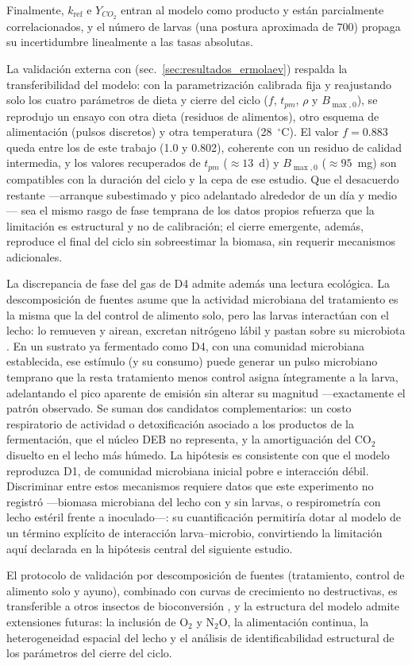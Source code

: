 Finalmente, $k_{\mathrm{ref}}$ e $Y_{CO_2}$ entran al modelo como producto y están parcialmente correlacionados, y el número de larvas (una postura aproximada de 700) propaga su incertidumbre linealmente a las tasas absolutas.

La validación externa con \textcite{ermolaevGreenhouseGasEmissions2019} (sec.~\ref{sec:resultados_ermolaev}) respalda la transferibilidad del modelo: con la parametrización calibrada fija y reajustando solo los cuatro parámetros de dieta y cierre del ciclo ($f$, $t_{pm}$, $\rho$ y $B_{\max,0}$), se reprodujo un ensayo con otra dieta (residuos de alimentos), otro esquema de alimentación (pulsos discretos) y otra temperatura (28~$^{\circ}$C). El valor $f = 0.883$ queda entre los de este trabajo (1.0 y 0.802), coherente con un residuo de calidad intermedia, y los valores recuperados de $t_{pm}$ ($\approx 13$~d) y $B_{\max,0}$ ($\approx 95$~mg) son compatibles con la duración del ciclo y la cepa de ese estudio. Que el desacuerdo restante ---arranque subestimado y pico adelantado alrededor de un día y medio--- sea el mismo rasgo de fase temprana de los datos propios refuerza que la limitación es estructural y no de calibración; el cierre emergente, además, reproduce el final del ciclo sin sobreestimar la biomasa, sin requerir mecanismos adicionales.

La discrepancia de fase del gas de D4 admite además una lectura ecológica. La descomposición de fuentes asume que la actividad microbiana del tratamiento es la misma que la del control de alimento solo, pero las larvas interactúan con el lecho: lo remueven y airean, excretan nitrógeno lábil y pastan sobre su microbiota \parencite{liuBlackSoldierFly2008,zhangBlackSoldierFly2021}. En un sustrato ya fermentado como D4, con una comunidad microbiana establecida, ese estímulo \parencite{qinBlackSoldierFly2026} (y su consumo) puede generar un pulso microbiano temprano que la resta tratamiento menos control asigna íntegramente a la larva, adelantando el pico aparente de emisión sin alterar su magnitud ---exactamente el patrón observado. Se suman dos candidatos complementarios: un costo respiratorio de actividad o detoxificación asociado a los productos de la fermentación, que el núcleo DEB no representa, y la amortiguación del CO$_2$ disuelto en el lecho más húmedo. La hipótesis es consistente con que el modelo reproduzca D1, de comunidad microbiana inicial pobre e interacción débil. Discriminar entre estos mecanismos requiere datos que este experimento no registró ---biomasa microbiana del lecho con y sin larvas, o respirometría con lecho estéril frente a inoculado---: su cuantificación permitiría dotar al modelo de un término explícito de interacción larva--microbio, convirtiendo la limitación aquí declarada en la hipótesis central del siguiente estudio.

El protocolo de validación por descomposición de fuentes (tratamiento, control de alimento solo y ayuno), combinado con curvas de crecimiento no destructivas, es transferible a otros insectos de bioconversión \parencite{nielsenMetabolicPerformanceMealworms2025}, y la estructura del modelo admite extensiones futuras: la inclusión de O$_2$ y N$_2$O, la alimentación continua, la heterogeneidad espacial del lecho y el análisis de identificabilidad estructural de los parámetros del cierre del ciclo.
